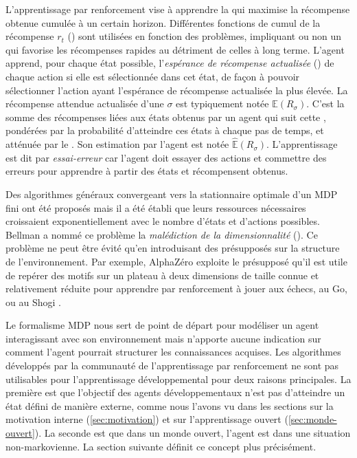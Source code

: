 L'apprentissage par renforcement vise à apprendre la  qui maximise la récompense obtenue cumulée à un certain horizon. 
Différentes fonctions de cumul de la récompense $r_t$ () sont utilisées en fonction des problèmes, impliquant ou non un  qui favorise les récompenses rapides au détriment de celles à long terme.  
L'agent apprend, pour chaque état possible, l'\emph{espérance de récompense actualisée} () de chaque action si elle est sélectionnée dans cet état, de façon à pouvoir sélectionner l'action ayant l'espérance de récompense actualisée la plus élevée. 
La récompense attendue actualisée d'une  $\sigma$ est typiquement notée $\mathbb{E}(R_\sigma)$.
C'est la somme des récompenses liées aux états obtenus par un agent qui suit cette , pondérées par la probabilité d'atteindre ces états à chaque pas de temps, et atténuée par le . 
Son estimation par l'agent est notée $\hat{\mathbb{E}}(R_\sigma)$.
L'apprentissage est dit par \emph{essai-erreur} car l'agent doit essayer des actions et commettre des erreurs pour apprendre à partir des états et récompensent obtenus. 

Des algorithmes généraux convergeant vers la  stationnaire optimale d'un MDP fini ont été proposés \cite{ross_introduction_1983} mais il a été établi que leurs ressources nécessaires croissaient exponentiellement avec le nombre d'états et d'actions possibles.
Bellman a nommé ce problème la \emph{malédiction de la dimensionnalité} ().
Ce problème ne peut être évité qu'en introduisant des présupposés sur la structure de l'environnement. 
Par exemple, AlphaZéro exploite le présupposé qu'il est utile de repérer des motifs sur un plateau à deux dimensions de taille connue et relativement réduite pour apprendre par renforcement à jouer aux échecs, au Go, ou au Shogi \cite{silver_general_2018}.


Le formalisme MDP nous sert de point de départ pour modéliser un agent interagissant avec son environnement mais n'apporte aucune indication sur comment l'agent pourrait structurer les connaissances acquises.  
Les algorithmes développés par la communauté de l'apprentissage par renforcement ne sont pas utilisables pour l'apprentissage développemental pour deux raisons principales. 
La première est que l'objectif des agents développementaux n'est pas d'atteindre un état défini de manière externe, comme nous l'avons vu dans les sections sur la motivation interne (\ref{sec:motivation}) et sur l'apprentissage ouvert (\ref{sec:monde-ouvert}).
La seconde est que dans un monde ouvert, l'agent est dans une situation non-markovienne. 
La section suivante définit ce concept plus précisément.

